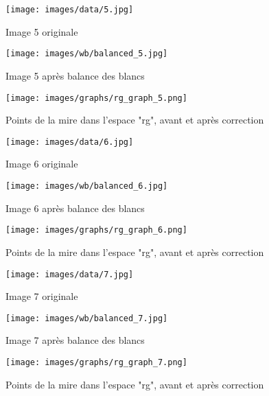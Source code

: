 \documentclass[12pt]{article}
\begin{document}
\begin{figure}[H]
    \centering
    \begin{minipage}{0.32\textwidth}
        \centering
        \texttt{[image: images/data/5.jpg]}
        \caption{Image 5 originale}
    \end{minipage}
    \hfill
    \begin{minipage}{0.32\textwidth}
        \centering
        \texttt{[image: images/wb/balanced\_5.jpg]}
        \caption{Image 5 après balance des blancs}
    \end{minipage}
    \begin{minipage}{0.32\textwidth}
        \centering
        \texttt{[image: images/graphs/rg\_graph\_5.png]}
        \caption{Points de la mire dans l'espace "rg", avant et après correction}
    \end{minipage}
\end{figure}

\begin{figure}[H]
    \centering
    \begin{minipage}{0.32\textwidth}
        \centering
        \texttt{[image: images/data/6.jpg]}
        \caption{Image 6 originale}
    \end{minipage}
    \hfill
    \begin{minipage}{0.32\textwidth}
        \centering
        \texttt{[image: images/wb/balanced\_6.jpg]}
        \caption{Image 6 après balance des blancs}
    \end{minipage}
    \begin{minipage}{0.32\textwidth}
        \centering
        \texttt{[image: images/graphs/rg\_graph\_6.png]}
        \caption{Points de la mire dans l'espace "rg", avant et après correction}
    \end{minipage}
\end{figure}

\begin{figure}[H]
    \centering
    \begin{minipage}{0.32\textwidth}
        \centering
        \texttt{[image: images/data/7.jpg]}
        \caption{Image 7 originale}
    \end{minipage}
    \hfill
    \begin{minipage}{0.32\textwidth}
        \centering
        \texttt{[image: images/wb/balanced\_7.jpg]}
        \caption{Image 7 après balance des blancs}
    \end{minipage}
    \begin{minipage}{0.32\textwidth}
        \centering
        \texttt{[image: images/graphs/rg\_graph\_7.png]}
        \caption{Points de la mire dans l'espace "rg", avant et après correction}
    \end{minipage}
\end{figure}
\end{document}
